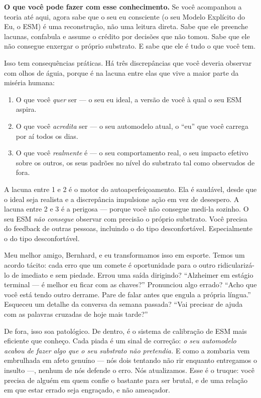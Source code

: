 \documentclass[11pt, twoside, openright]{book}
\begin{document}
\textbf{O que você pode fazer com esse conhecimento.} Se você acompanhou a teoria até aqui, agora sabe que o seu eu consciente (o seu Modelo Explícito do Eu, o ESM) é uma reconstrução, não uma leitura direta. Sabe que ele preenche lacunas, confabula e assume o crédito por decisões que não tomou. Sabe que ele não consegue enxergar o próprio substrato. E sabe que ele é tudo o que você tem.

Isso tem consequências práticas. Há três discrepâncias que você deveria observar com olhos de águia, porque é na lacuna entre elas que vive a maior parte da miséria humana:

\begin{enumerate}
  \item O que você \textit{quer} ser --- o seu eu ideal, a versão de você à qual o seu ESM aspira.
  \item O que você \textit{acredita} ser --- o seu automodelo atual, o ``eu'' que você carrega por aí todos os dias.
  \item O que você \textit{realmente} é --- o seu comportamento real, o seu impacto efetivo sobre os outros, os seus padrões no nível do substrato tal como observados de fora.
\end{enumerate}

A lacuna entre 1 e 2 é o motor do autoaperfeiçoamento. Ela é saudável, desde que o ideal seja realista e a discrepância impulsione ação em vez de desespero. A lacuna entre 2 e 3 é a perigosa --- porque você não consegue medi-la sozinho. O seu ESM \textit{não consegue} observar com precisão o próprio substrato. Você precisa do feedback de outras pessoas, incluindo o do tipo desconfortável. Especialmente o do tipo desconfortável.

Meu melhor amigo, Bernhard, e eu transformamos isso em esporte. Temos um acordo tácito: cada erro que um comete é oportunidade para o outro ridicularizá-lo de imediato e sem piedade. Errou uma saída dirigindo? ``Alzheimer em estágio terminal --- é melhor eu ficar com as chaves?'' Pronunciou algo errado? ``Acho que você está tendo outro derrame. Pare de falar antes que engula a própria língua.'' Esqueceu um detalhe da conversa da semana passada? ``Vai precisar de ajuda com as palavras cruzadas de hoje mais tarde?''

De fora, isso soa patológico. De dentro, é o sistema de calibração de ESM mais eficiente que conheço. Cada piada é um sinal de correção: \textit{o seu automodelo acabou de fazer algo que o seu substrato não pretendia.} E como a zombaria vem embrulhada em afeto genuíno --- nós dois tentando não rir enquanto entregamos o insulto ---, nenhum de nós defende o erro. Nós atualizamos. Esse é o truque: você precisa de alguém em quem confie o bastante para ser brutal, e de uma relação em que estar errado seja engraçado, e não ameaçador.
\end{document}
